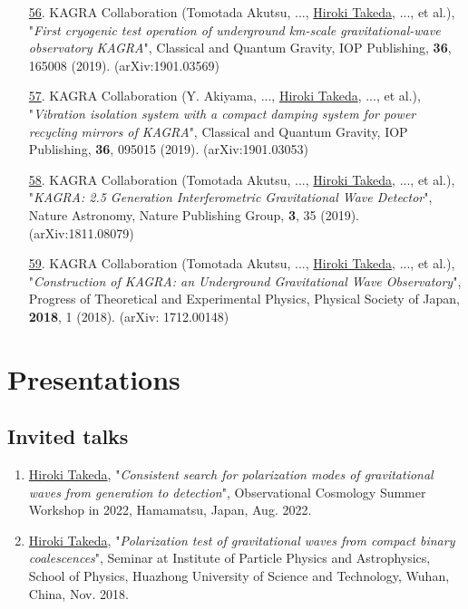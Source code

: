 \documentclass[uplatex, 12pt]{article}
\begin{document}
\begin{enumerate}
\item[\uline{56}.] KAGRA Collaboration (Tomotada Akutsu, ..., \uline{Hiroki Takeda}, ..., et al.), "\emph{First cryogenic test operation of underground km-scale gravitational-wave observatory KAGRA}", Classical and Quantum Gravity, IOP Publishing, {\bf 36}, 165008 (2019). (arXiv:1901.03569)\\

\item[\uline{57}.] KAGRA Collaboration (Y. Akiyama, ..., \uline{Hiroki Takeda}, ..., et al.), "\emph{Vibration isolation system with a compact damping system for power recycling mirrors of KAGRA}", Classical and Quantum Gravity, IOP Publishing, {\bf 36}, 095015 (2019). (arXiv:1901.03053)\\

\item[\uline{58}.] KAGRA Collaboration (Tomotada Akutsu, ..., \uline{Hiroki Takeda}, ..., et al.), "\emph{KAGRA: 2.5 Generation Interferometric Gravitational Wave Detector}", Nature Astronomy, Nature Publishing Group, {\bf 3}, 35 (2019). (arXiv:1811.08079)\\

\item[\uline{59}.] KAGRA Collaboration (Tomotada Akutsu, ..., \uline{Hiroki Takeda}, ..., et al.), "\emph{Construction of KAGRA: an Underground Gravitational Wave Observatory}", Progress of Theoretical and Experimental Physics, Physical Society of Japan, {\bf 2018}, 1 (2018). (arXiv: 1712.00148)

\end{enumerate}


\section*{Presentations}

\subsection*{Invited talks}
\begin{enumerate}
\item \uline{Hiroki Takeda}, "\emph{Consistent search for polarization modes of gravitational waves from generation to detection}", Observational Cosmology Summer Workshop in 2022,  Hamamatsu, Japan, Aug. 2022.\\

\item \uline{Hiroki Takeda}, "\emph{Polarization test of gravitational waves from compact binary coalescences}", Seminar at Institute of Particle Physics and Astrophysics, School of Physics, Huazhong University of Science and Technology, Wuhan, China, Nov. 2018.\\
\end{enumerate}
\end{document}
